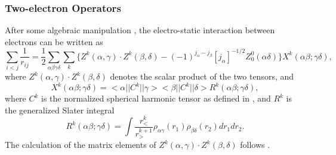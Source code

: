 \documentclass[preprint, floatfix, pra, showpacs, showkeys]{revtex4}
\begin{document}
\subsubsection{Two-electron Operators}
After some algebraic manipulation \cite{barshalom88}, the
electro-static interaction between electrons can be written as 
\begin{equation}
\label{eq_2e}
\sum_{i<j} \frac{1}{r_{ij}} = \frac{1}{2}
\sum_{\alpha\beta\gamma\delta}
\sum_{k}\Bigg\{Z^k(\alpha,\gamma)\cdot Z^k(\beta,\delta)
-(-1)^{j_\alpha-j_\beta}[j_\alpha]^{-1/2}Z^0_0(\alpha\delta)\Bigg\}
X^k(\alpha\beta;\gamma\delta),
\end{equation}
where $Z^k(\alpha,\gamma)\cdot Z^k(\beta,\delta)$ denotes the scalar product
of the two tensors, and 
\begin{equation}
X^k(\alpha\beta;\gamma\delta) = <\alpha||C^k||\gamma><\beta||C^k||\delta>
R^k(\alpha\beta;\gamma\delta),
\end{equation}
where $C^k$ is the normalized spherical harmonic tensor as defined in
\textcite{cowan81}, and $R^k$ is the generalized Slater integral
\begin{equation}
R^k(\alpha\beta;\gamma\delta) = \int \frac{r_<^k}{r_>^{k+1}}
\rho_{\alpha\gamma}(r_1)\rho_{\beta\delta}(r_2)d r_1 d r_2.
\end{equation}
The calculation of the 
matrix elements of $Z^k(\alpha,\gamma)\cdot Z^k(\beta,\delta)$ follows
\textcite{gaigalas97}.
\end{document}
